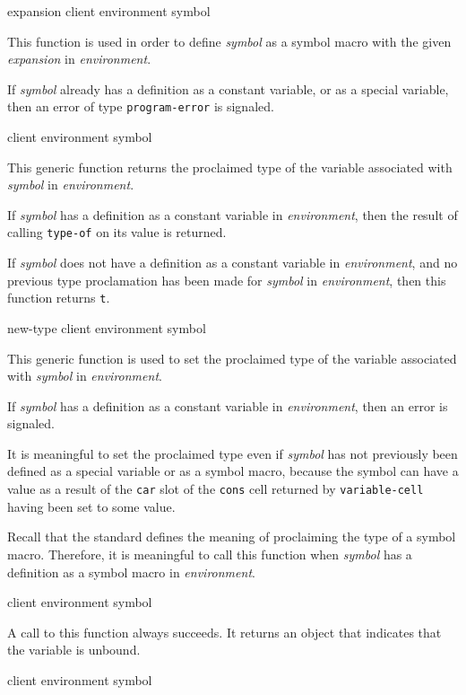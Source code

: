  {expansion client environment symbol}

This function is used in order to define \textit{symbol} as a symbol
macro with the given \textit{expansion} in \textit{environment}.

If \textit{symbol} already has a definition as a constant variable, or
as a special variable, then an error of type \texttt{program-error} is
signaled.

 {client environment symbol}

This generic function returns the proclaimed type of the variable
associated with \textit{symbol} in \textit{environment}.

If \textit{symbol} has a definition as a constant variable in
\textit{environment}, then the result of calling \texttt{type-of} on
its value is returned.

If \textit{symbol} does not have a definition as a constant variable
in \textit{environment}, and no previous type proclamation has been
made for \textit{symbol} in \textit{environment}, then this function
returns \texttt{t}.

 {new-type client environment symbol}

This generic function is used to set the proclaimed type of the
variable associated with \textit{symbol} in \textit{environment}.

If \textit{symbol} has a definition as a constant variable in
\textit{environment}, then an error is signaled.

It is meaningful to set the proclaimed type even if \textit{symbol}
has not previously been defined as a special variable or as a symbol
macro, because the symbol can have a value as a result of the
\texttt{car} slot of the \texttt{cons} cell returned by
\texttt{variable-cell} having been set to some value.

Recall that the \commonlisp{} standard defines the meaning of
proclaiming the type of a symbol macro.  Therefore, it is meaningful
to call this function when \textit{symbol} has a definition as a
symbol macro in \textit{environment}.

 {client environment symbol}

A call to this function always succeeds.  It returns an object that indicates
that the variable is unbound.

 {client environment symbol}

